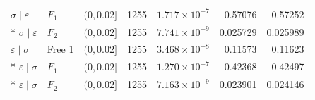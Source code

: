 \begin{longtable}{lllrrrr}
$\sigma\mid \varepsilon$ & $F_1$ & $(0,0.02]$ & 1255 & $1.717\!\times\!10^{-7}$ & 0.57076 & 0.57252\\*
$\sigma\mid \varepsilon$ & $F_2$ & $(0,0.02]$ & 1255 & $7.741\!\times\!10^{-9}$ & 0.025729 & 0.025989\\
\midrule
$\varepsilon\mid \sigma$ & Free 1 & $(0,0.02]$ & 1255 & $3.468\!\times\!10^{-8}$ & 0.11573 & 0.11623\\*
$\varepsilon\mid \sigma$ & $F_1$ & $(0,0.02]$ & 1255 & $1.270\!\times\!10^{-7}$ & 0.42368 & 0.42497\\*
$\varepsilon\mid \sigma$ & $F_2$ & $(0,0.02]$ & 1255 & $7.163\!\times\!10^{-9}$ & 0.023901 & 0.024146\\
\end{longtable}
\endgroup
